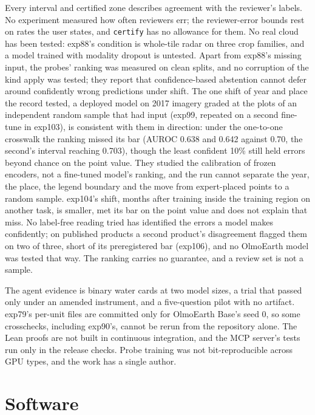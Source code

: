 \documentclass[11pt,a4paper]{article}
\newcommand{\code}[1]{\texttt{#1}}
\begin{document}
Every interval and certified zone describes agreement with the reviewer's labels. No experiment measured how often
reviewers err; the reviewer-error bounds rest on rates the user states, and \code{certify} has no allowance for them.
No real cloud has been tested: exp88's condition is whole-tile radar on three crop families, and a model trained with
modality dropout is untested. Apart from exp88's missing input, the probes' ranking was measured on clean splits, and
no corruption of the kind \citet{lehmann2026} apply was tested; they report that confidence-based abstention cannot
defer around confidently wrong predictions under shift. The one shift of year and place the record tested, a deployed
model on 2017 imagery graded at the plots of an independent random sample that had input (exp99, repeated on a second
fine-tune in exp103), is consistent with them in direction: under the one-to-one crosswalk the ranking missed its bar
(AUROC 0.638 and 0.642 against 0.70, the second's interval reaching 0.703), though the least confident 10\% still held
errors beyond chance on the point value. They studied the calibration of frozen encoders, not a fine-tuned model's
ranking, and the run cannot separate the year, the place, the legend boundary and the move from expert-placed points
to a random sample. exp104's shift, months after training inside the training region on another task, is smaller,
met its bar on the point value and does not explain that miss. No label-free reading tried has identified the errors a model
makes confidently; on published products a second product's disagreement flagged them on two of three, short of its
preregistered bar (exp106), and no OlmoEarth model was tested that way. The ranking carries no guarantee, and a review set is not a sample.

The agent evidence is binary water cards at two model sizes, a trial that passed only under an amended instrument, and
a five-question pilot with no artifact. exp79's per-unit files are committed only for OlmoEarth Base's seed 0, so some
crosschecks, including exp90's, cannot be rerun from the repository alone. The Lean proofs are not built in continuous
integration, and the MCP server's tests run only in the release checks. Probe training was not bit-reproducible across
GPU types, and the work has a single author.

\section{Software}
\label{sec:software}
\end{document}
